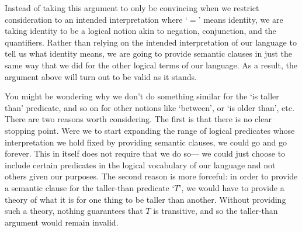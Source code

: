 Instead of taking this argument to only be convincing when we restrict consideration to an intended interpretation where `$=$' means identity, we are taking identity to be a logical notion akin to negation, conjunction, and the quantifiers.
Rather than relying on the intended interpretation of our language to tell us what identity means, we are going to provide semantic clauses in just the same way that we did for the other logical terms of our language.
As a result, the argument above will turn out to be valid as it stands.

You might be wondering why we don't do something similar for the `is taller than' predicate, and so on for other notions like `between', or `is older than', etc.
There are two reasons worth considering.
The first is that there is no clear stopping point.
Were we to start expanding the range of logical predicates whose interpretation we hold fixed by providing semantic clauses, we could go and go forever.
This in itself does not require that we do so--- we could just choose to include certain predicates in the logical vocabulary of our language and not others given our purposes.
The second reason is more forceful: in order to provide a semantic clause for the taller-than predicate `$T$', we would have to provide a theory of what it is for one thing to be taller than another.
Without providing such a theory, nothing guarantees that $T$ is transitive, and so the taller-than argument would remain invalid. 

